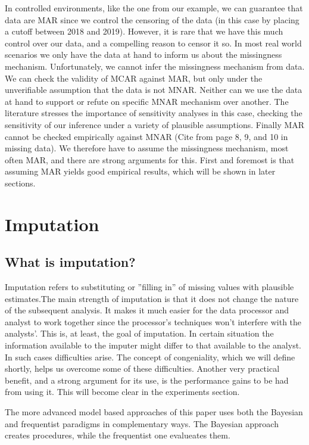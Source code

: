 \documentclass{article}
\begin{document}
	In controlled environments, like the one from our example, we can guarantee that data are MAR since we control the censoring of the data (in this case by placing a cutoff between 2018 and 2019). However, it is rare that we have this much control over our data, and a compelling reason to censor it so. In most real world scenarios we only have the data at hand to inform us about the missingness mechanism. Unfortunately, we cannot infer the missingness mechanism from data.  We can check the validity of MCAR against MAR, but only under the unverifiable assumption that the data is not MNAR. Neither can we use the data at hand to support or refute on specific MNAR mechanism over another. The literature stresses the importance of sensitivity analyses in this case, checking the sensitivity of our inference under a variety of plausible assumptions. Finally MAR cannot be checked empirically against MNAR  (Cite from page 8, 9, and 10 in missing data). We therefore have to assume the missingness mechanism, most often MAR, and there are strong arguments for this. First and foremost is that assuming MAR yields good empirical results, which will be shown in later sections. %
	
	\section{Imputation}
	
	\subsection{What is imputation?}
	Imputation refers to substituting or ''filling in'' of missing values with plausible estimates.The main strength of imputation is that it does not change the nature of the subsequent analysis. It makes it much easier for the data processor and analyst to work together since the processor's techniques won't interfere with the analysts'. This is, at least, the goal of imputation. In certain situation the information available to the imputer might differ to that available to the analyst. In such cases difficulties arise. The concept of congeniality, which we will define shortly, helps us overcome some of these difficulties. Another very practical benefit, and a strong argument for its use, is the performance gains to be had from using it. This will become clear in the experiments section.
	
	The more advanced model based approaches of this paper uses both the Bayesian and frequentist paradigms in complementary ways. The Bayesian approach creates procedures, while the frequentist one evalueates them.
	
\end{document}
